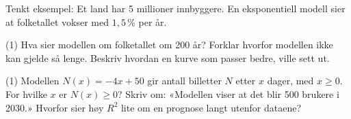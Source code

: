 Tenkt eksempel: Et land har 5 millioner innbyggere. En eksponentiell modell sier at folketallet vokser med $1{,}5\,\%$ per år.
\begin{tasks}(1)
  \task Hva sier modellen om folketallet om 200 år?
  \task Forklar hvorfor modellen ikke kan gjelde så lenge.
  \task Beskriv hvordan en kurve som passer bedre, ville sett ut.
\end{tasks}

\begin{sjekk}
\begin{tasks}(1)
  \task Modellen $N(x) = -4x + 50$ gir antall billetter $N$ etter $x$ dager, med $x \ge 0$. For hvilke $x$ er $N(x) \ge 0$?
  \task Skriv om: «Modellen viser at det blir 500 brukere i 2030.»
  \task Hvorfor sier høy $R^2$ lite om en prognose langt utenfor dataene?
\end{tasks}
\end{sjekk}
